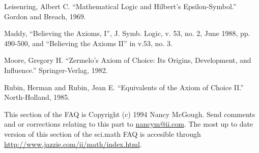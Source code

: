 Leisenring, Albert C.  ``Mathematical Logic and Hilbert's Epsilon-Symbol.''
Gordon and Breach, 1969.

Maddy, ``Believing the Axioms, I'', J. Symb. Logic, v. 53, no. 2, June 1988,
pp. 490-500, and ``Believing the Axioms II'' in v.53, no. 3.

Moore, Gregory H.  ``Zermelo's Axiom of Choice: Its Origins, Development, and
Influence.''  Springer-Verlag, 1982.

Rubin, Herman and Rubin, Jean E.  ``Equivalents of the Axiom of Choice II.''
North-Holland, 1985.

This section of the FAQ is Copyright (c) 1994 Nancy McGough.  Send comments
and or corrections relating to this part to \url{nancym@ii.com}.  The most up to
date version of this section of the sci.math FAQ is accesible through
\url{http://www.jazzie.com/ii/math/index.html}.
